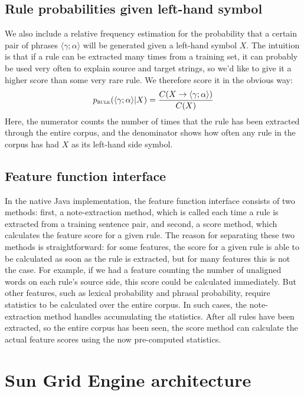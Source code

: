 \documentclass{pbml}
\begin{document}
\subsection{Rule probabilities given left-hand symbol}
We also include a relative frequency estimation for the probability that a certain pair of phrases $\langle \gamma ; \alpha \rangle$ will be generated given a left-hand symbol $X$. The intuition is that if a rule can be extracted many times from a training set, it can probably be used very often to explain source and target strings, so we'd like to give it a higher score than some very rare rule. We therefore score it in the obvious way:
$$p_{\textsc{rule}}(\langle \gamma ; \alpha \rangle | X) = \frac{C(X \to \langle \gamma ; \alpha \rangle)}{C(X)}$$
Here, the numerator counts the number of times that the rule has been extracted through the entire corpus, and the denominator shows how often any rule in the corpus has had $X$ as its left-hand side symbol.

\subsection{Feature function interface}

In the native Java implementation, the feature function interface consists of two methods: first, a {\sc note-extraction} method, which is called each time a rule is extracted from a training sentence pair, and second, a {\sc score} method, which calculates the feature score for a given rule. The reason for separating these two methods is straightforward: for some features, the score for a given rule is able to be calculated as soon as the rule is extracted, but for many features this is not the case. For example, if we had a feature counting the number of unaligned words on each rule's source side, this score could be calculated immediately. But other features, such as lexical probability and phrasal probability, require statistics to be calculated over the entire corpus. In such cases, the {\sc note-extraction} method handles accumulating the statistics. After all rules have been extracted, so the entire corpus has been seen, the {\sc score} method can calculate the actual feature scores using the now pre-computed statistics.

\section{Sun Grid Engine architecture}
\label{sec:sge}
\end{document}
